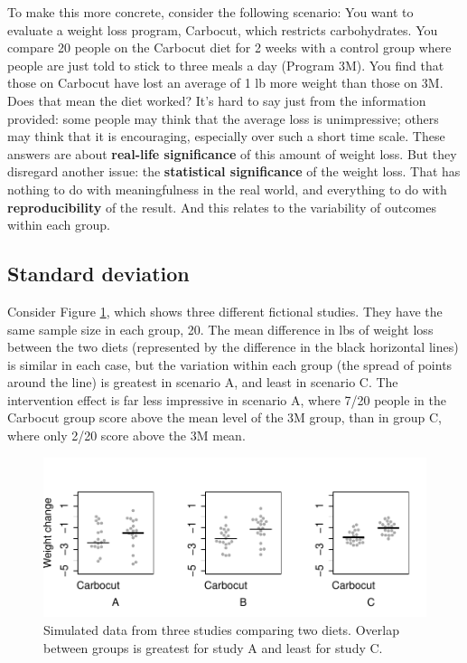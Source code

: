 \documentclass{krantz}
\begin{document}
To make this more concrete, consider the following scenario: You want to evaluate a weight loss program, Carbocut, which restricts carbohydrates. You compare 20 people on the Carbocut diet for 2 weeks with a control group where people are just told to stick to three meals a day (Program 3M). You find that those on Carbocut have lost an average of 1 lb more weight than those on 3M. Does that mean the diet worked? It's hard to say just from the information provided: some people may think that the average loss is unimpressive; others may think that it is encouraging, especially over such a short time scale. These answers are about \textbf{real-life significance} of this amount of weight loss. But they disregard another issue: the \textbf{statistical significance} of the weight loss. That has nothing to do with meaningfulness in the real world, and everything to do with \textbf{reproducibility} of the result. And this relates to the variability of outcomes within each group.

\hypertarget{standard-deviation}{%
\subsection{Standard deviation}\label{standard-deviation}}

Consider Figure \ref{fig:demo-variation}, which shows three different fictional studies. They have the same sample size in each group, 20. The mean difference in lbs of weight loss between the two diets (represented by the difference in the black horizontal lines) is similar in each case, but the variation within each group (the spread of points around the line) is greatest in scenario A, and least in scenario C. The intervention effect is far less impressive in scenario A, where 7/20 people in the Carbocut group score above the mean level of the 3M group, than in group C, where only 2/20 score above the 3M mean.

\begin{figure}
\includegraphics[width=0.9\linewidth]{images_bw/demo-variation} \caption{Simulated data from three studies comparing two diets. Overlap between groups is greatest for study A and least for study C.}\label{fig:demo-variation}
\end{figure}
\end{document}
